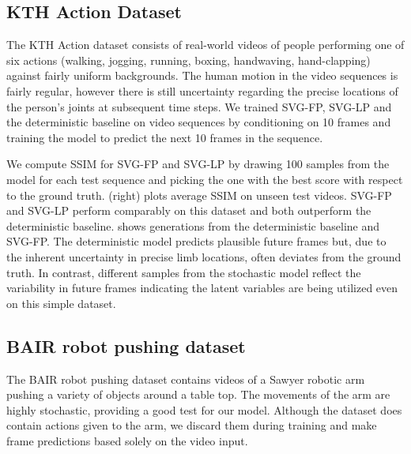 \subsection{KTH Action Dataset}
The KTH Action dataset \cite{kth} consists of real-world videos of
people performing one of six actions (walking, jogging, running, boxing, handwaving, hand-clapping)
against fairly uniform backgrounds. 
The human motion in the video sequences is fairly regular, however there is still uncertainty regarding the precise locations of the person's joints at subsequent time steps. 
We trained SVG-FP, SVG-LP and the deterministic baseline on  video sequences by conditioning on 10 frames and  training the model to predict the next 10 frames in the sequence.

We compute SSIM for SVG-FP and SVG-LP by drawing 100 samples from the model for each test sequence and picking the one with the best score with respect to the ground truth. 
(right) plots average SSIM on unseen test videos.
SVG-FP and SVG-LP perform comparably on this dataset and both outperform the deterministic baseline.
 shows generations from the deterministic baseline and SVG-FP. 
The deterministic model predicts plausible future frames but, due to the inherent uncertainty in precise limb locations, often deviates from the ground truth.
In contrast, different samples from the stochastic model reflect the variability in future frames indicating the latent variables are being utilized even on this simple dataset. 






\subsection{BAIR robot pushing dataset}
The BAIR robot pushing dataset \cite{ebert17} contains videos of a
Sawyer robotic arm pushing a variety of objects around a table top.
The movements of the arm are highly stochastic, providing a good test
for our model. Although the dataset does contain actions given to the
arm, we discard them during training and make frame
predictions based solely on the video input.

